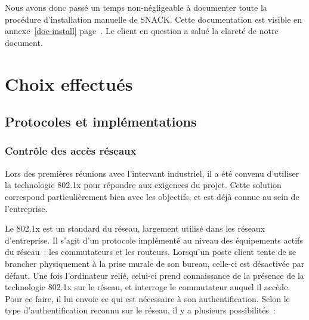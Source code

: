 Nous avons donc passé un temps non-négligeable à documenter toute la procédure d'installation manuelle de SNACK. Cette documentation est visible en annexe~\ref{doc-install} page~\pageref{doc-install}. Le client en question a salué la clareté de notre document.

\section{Choix effectués}
\subsection{Protocoles et implémentations}
\subsubsection{Contrôle des accès réseaux}

Lors des premières réunions avec l'intervant industriel, il a été convenu d'utiliser la technologie 802.1x pour répondre aux exigences du projet. Cette solution correspond particulièrement bien avec les objectifs, et est déjà connue au sein de l'entreprise.

Le 802.1x est un standard du réseau, largement utilisé dans les réseaux d'entreprise. Il s'agit d'un protocole implémenté au niveau des équipements actifs du réseau~: les commutateurs et les routeurs. Lorsqu'un poste client tente de se brancher physiquement à la prise murale de son bureau, celle-ci est désactivée par défaut. Une fois l'ordinateur relié, celui-ci prend connaissance de la présence de la technologie 802.1x sur le réseau, et interroge le commutateur auquel il accède. Pour ce faire, il lui envoie ce qui est nécessaire à son authentification. Selon le type d'authentification reconnu sur le réseau, il y a plusieurs possibilités~:

